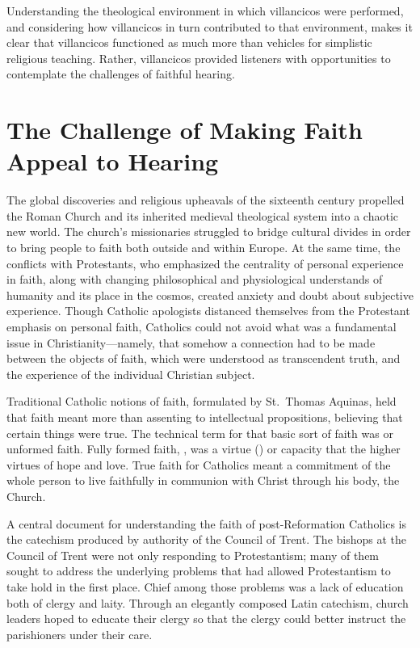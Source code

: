 Understanding the theological environment in which villancicos were performed, and considering how villancicos in turn contributed to that environment, makes it clear that villancicos functioned as much more than vehicles for simplistic religious teaching.
Rather, villancicos provided listeners with opportunities to contemplate the challenges of faithful hearing.

\section{The Challenge of Making Faith Appeal to Hearing}

The global discoveries and religious upheavals of the sixteenth century propelled the Roman Church and its inherited medieval theological system into a chaotic new world.
The church's missionaries struggled to bridge cultural divides in order to bring people to faith both outside and within Europe.
At the same time, the conflicts with Protestants, who emphasized the centrality of personal  experience in faith, along with changing philosophical and physiological understands of humanity and its place in the cosmos, created anxiety and doubt about subjective experience.
Though Catholic apologists distanced themselves from the Protestant emphasis on personal faith, Catholics could not avoid what was a fundamental issue in Christianity---namely, that somehow a connection had to be made between the objects of faith, which were understood as transcendent truth, and the experience of the individual Christian subject.

Traditional Catholic notions of faith, formulated by St.\ Thomas Aquinas, held that faith meant more than assenting to intellectual propositions, believing that certain things were true.\citXXX
The technical term for that basic sort of faith was  or unformed faith.\citXXX
Fully formed faith, , was a virtue () or capacity that  the higher virtues of hope and love.
True faith for Catholics meant a commitment of the whole person to live faithfully in communion with Christ through his body, the Church.\citXXX

A central document for understanding the faith of post-Reformation Catholics is the catechism produced  by authority of the Council of Trent.%
  \autocite{Catholic:Catechismus1614}
The bishops at the Council of Trent were not only responding to Protestantism; many of them sought to address the underlying problems that had allowed Protestantism to take hold in the first place.\citXXX{}
Chief among those problems was a lack of education both of clergy and laity.
Through an elegantly composed Latin catechism, church leaders hoped to educate their clergy so that the clergy could better instruct the parishioners under their care.


